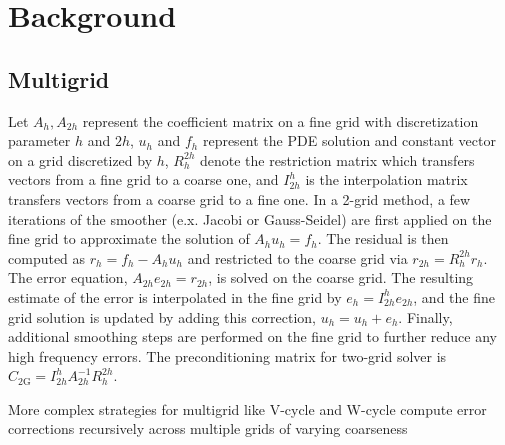 \documentclass{article} %
\begin{document}












\appendix
\section{Background} \label{sec:appbackground}

\subsection{Multigrid} \label{sec:multigrid}

Let $A_h, A_{2h}$ represent the coefficient matrix on a fine grid with discretization parameter $h$ and $2h$, $u_h$ and $f_h$ represent the PDE solution and constant vector on a grid discretized by $h$, $R^{2h}_h$ denote the restriction matrix which transfers vectors from a fine grid to a coarse one, and $I^{h}_{2h}$ is the interpolation matrix transfers vectors from a coarse grid to a fine one. In a 2-grid method, a few iterations of the smoother (e.x. Jacobi or Gauss-Seidel) are first applied on the fine grid to approximate the solution of $A_hu_h = f_h$. The residual is then computed as $r_h = f_h - A_hu_h$ and restricted to the coarse grid via $r_{2h} = R^{2h}_hr_h$. The error equation, $A_{2h}e_{2h} = r_{2h}$, is solved on the coarse grid. The resulting estimate of the error is interpolated in the fine grid by $e_h = I^{h}_{2h}e_{2h}$, and the fine grid solution is updated by adding this correction, $u_h = u_h + e_h$. Finally, additional smoothing steps are performed on the fine grid to further reduce any high frequency errors. The preconditioning matrix for two-grid solver is $C_\mathrm{2G} = I^{h}_{2h}A_{2h}^{-1}R^{2h}_h$.

More complex strategies for multigrid like V-cycle and W-cycle compute error corrections recursively across multiple grids of varying coarseness %
\end{document}
